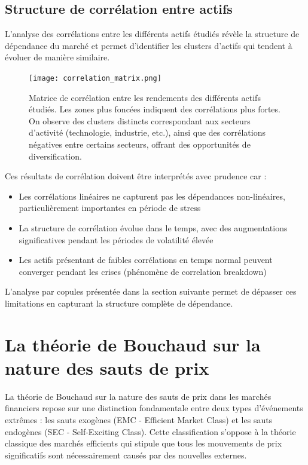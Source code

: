 \documentclass[12pt,a4paper]{article}
\theoremstyle{definition}
\theoremstyle{remark}
\begin{document}
\subsection{Structure de corrélation entre actifs}

L'analyse des corrélations entre les différents actifs étudiés révèle la structure de dépendance du marché et permet d'identifier les clusters d'actifs qui tendent à évoluer de manière similaire.

\begin{figure}[h!]
    \centering
    \texttt{[image: correlation\_matrix.png]}
    \caption{Matrice de corrélation entre les rendements des différents actifs étudiés. Les zones plus foncées indiquent des corrélations plus fortes. On observe des clusters distincts correspondant aux secteurs d'activité (technologie, industrie, etc.), ainsi que des corrélations négatives entre certains secteurs, offrant des opportunités de diversification.}
    \label{fig:correlation_matrix}
\end{figure}

Ces résultats de corrélation doivent être interprétés avec prudence car :
\begin{itemize}
    \item Les corrélations linéaires ne capturent pas les dépendances non-linéaires, particulièrement importantes en période de stress
    \item La structure de corrélation évolue dans le temps, avec des augmentations significatives pendant les périodes de volatilité élevée
    \item Les actifs présentant de faibles corrélations en temps normal peuvent converger pendant les crises (phénomène de correlation breakdown)
\end{itemize}

L'analyse par copules présentée dans la section suivante permet de dépasser ces limitations en capturant la structure complète de dépendance.

\section{La théorie de Bouchaud sur la nature des sauts de prix}

La théorie de Bouchaud sur la nature des sauts de prix dans les marchés financiers repose sur une distinction fondamentale entre deux types d'événements extrêmes : les sauts exogènes (EMC - Efficient Market Class) et les sauts endogènes (SEC - Self-Exciting Class). Cette classification s'oppose à la théorie classique des marchés efficients qui stipule que tous les mouvements de prix significatifs sont nécessairement causés par des nouvelles externes.
\end{document}
